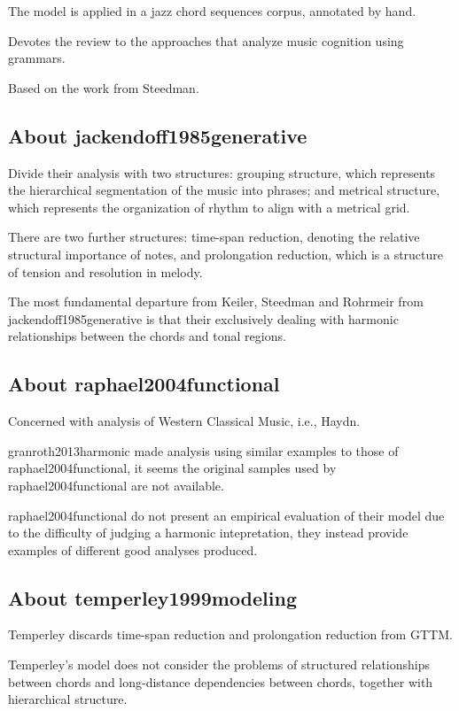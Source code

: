 		The model is applied in a jazz chord sequences corpus, annotated by hand.

		Devotes the review to the approaches that analyze music cognition using grammars.

		Based on the work from Steedman.

		\subsection{About jackendoff1985generative}
			Divide their analysis with two structures: grouping structure, which represents the hierarchical segmentation of the music into phrases; and metrical structure, which represents the organization of rhythm to align with a metrical grid.

			There are two further structures: time-span reduction, denoting the relative structural importance of notes, and prolongation reduction, which is a structure of tension and resolution in melody.

			The most fundamental departure from Keiler, Steedman and Rohrmeir from jackendoff1985generative is that their exclusively dealing with harmonic relationships between the chords and tonal regions.

		\subsection{About raphael2004functional}
			Concerned with analysis of Western Classical Music, i.e., Haydn.

			granroth2013harmonic made analysis using similar examples to those of raphael2004functional, it seems the original samples used by raphael2004functional are not available.

			raphael2004functional do not present an empirical evaluation of their model due to the difficulty of judging a harmonic intepretation, they instead provide examples of different good analyses produced.

		\subsection{About temperley1999modeling}
			Temperley discards time-span reduction and prolongation reduction from GTTM.

			Temperley's model does not consider the problems of structured relationships between chords and long-distance dependencies between chords, together with hierarchical structure.

